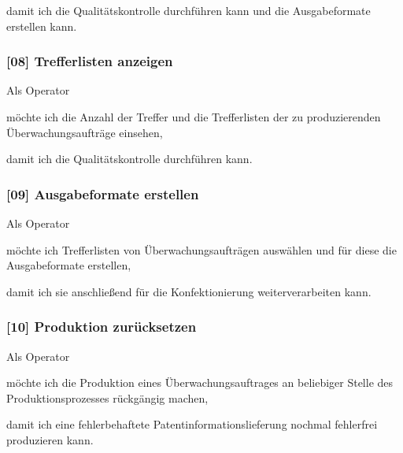 damit ich die Qualitätskontrolle durchführen kann und die Ausgabeformate erstellen kann.

\subsubsection{[08] Trefferlisten anzeigen}

Als Operator

möchte ich die Anzahl der Treffer und die Trefferlisten der zu produzierenden
Überwachungsaufträge einsehen,

damit ich die Qualitätskontrolle durchführen kann.

\subsubsection{[09] Ausgabeformate erstellen}

Als Operator

möchte ich Trefferlisten von Überwachungsaufträgen auswählen und für diese die
Ausgabeformate erstellen,

damit ich sie anschließend für die Konfektionierung weiterverarbeiten kann.

\subsubsection{[10] Produktion zurücksetzen}

Als Operator

möchte ich die Produktion eines Überwachungsauftrages an beliebiger Stelle des
Produktionsprozesses rückgängig machen,

damit ich eine fehlerbehaftete Patentinformationslieferung nochmal fehlerfrei
produzieren kann.
